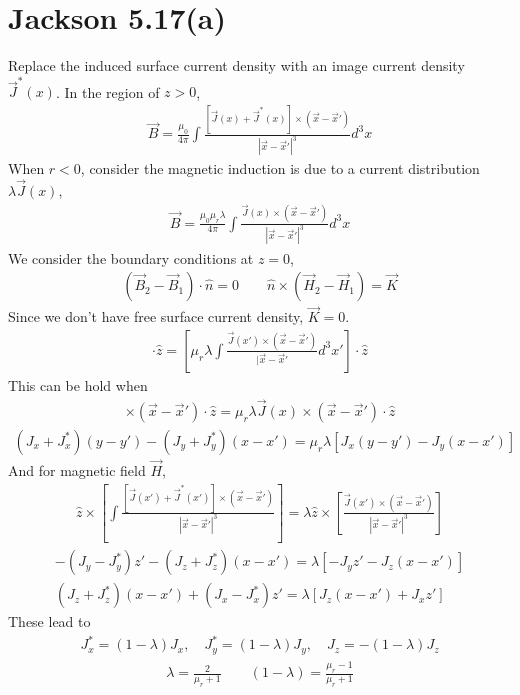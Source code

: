 \documentclass{article}
\begin{document}
\section*{Jackson 5.17(a)}

Replace the induced surface current density with an image current density $\vec J^*(x)$. In the region of  $z>0$,
\begin{align*}
  \vec B=\frac{\mu_0}{4\pi}\int\frac{[\vec J(x)+\vec J^*(x)]\times(\vec x-\vec x')}{|\vec x-\vec x'|^3}d^3x
\end{align*}
When $r<0$, consider the magnetic induction is due to a current distribution $\lambda\vec J(x)$,
\begin{align*}
  \vec B=\frac{\mu_0\mu_r\lambda}{4\pi}\int\frac{\vec J(x)\times(\vec x-\vec x')}{|\vec x-\vec x'|^3}d^3x
\end{align*}
We consider the boundary conditions at $z=0$,
\begin{align*}
  (\vec B_2-\vec B_1)\cdot\hat n=0\qquad \hat n\times(\vec H_2-\vec H_1)=\vec K
\end{align*}
Since we don't have free surface current density, $\vec K=0$.
\begin{align*}
  [\int \frac{[\vec J(x')+\vec J^*(x')]\times(\vec x-\vec x')}{|\vec x-\vec x'|^3}d^3x']\cdot\hat z=[\mu_r\lambda\int\frac{\vec J(x')\times(\vec x-\vec x')}{|\vec x-\vec x'}d^3x']\cdot\hat z
\end{align*}
This can be hold when
\begin{align*}
  [\vec J(x)+\vec J^*(x)]\times(\vec x-\vec x')\cdot\hat z=\mu_r\lambda\vec J(x)\times(\vec x-\vec x')\cdot\hat z
\end{align*}
\begin{align*}
  (J_x+J_x^*)(y-y')-(J_y+J^*_y)(x-x')=\mu_r\lambda[J_x(y-y')-J_y(x-x')]
\end{align*}
And for magnetic field $\vec H$,
\begin{align*}
  \hat z\times[\int\frac{[\vec J(x')+\vec J^*(x')]\times(\vec x-\vec x')}{|\vec x-\vec x'|^3}]=\lambda\hat z\times[\frac{\vec J(x')\times(\vec x-\vec x')}{|\vec x-\vec x'|^3}]
\end{align*}
\begin{align*}
  -(J_y-J^*_y)z'-(J_z+J^*_z)(x-x')=\lambda[-J_yz'-J_z(x-x')]\\
  (J_z+J_z^*)(x-x')+(J_x-J_x^*)z'=\lambda[J_z(x-x')+J_xz']
\end{align*}
These lead to
\begin{align*}
  J_x^*=(1-\lambda)J_x,\quad J_y^*=(1-\lambda)J_y,\quad J_z=-(1-\lambda)J_z
\end{align*}
\begin{align*}
  \lambda=\frac{2}{\mu_r+1}\qquad (1-\lambda)=\frac{\mu_r-1}{\mu_r+1}
\end{align*}
\end{document}

